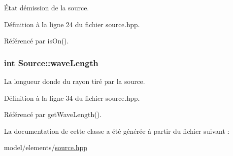 État d\textquotesingle{}émission de la source. 



Définition à la ligne 24 du fichier source.\+hpp.



Référencé par is\+On().

\hypertarget{classSource_a1909285fbaf2074d3aee9386a32ebb74}{}
\subsubsection[{wave\+Length}]{\setlength{\rightskip}{0pt plus 5cm}int Source\+::wave\+Length\hspace{0.3cm}{\ttfamily [private]}}\label{classSource_a1909285fbaf2074d3aee9386a32ebb74}


La longueur d\textquotesingle{}onde du rayon tiré par la source. 



Définition à la ligne 34 du fichier source.\+hpp.



Référencé par get\+Wave\+Length().



La documentation de cette classe a été générée à partir du fichier suivant \+:\begin{DoxyCompactItemize}
\item 
model/elements/\hyperlink{source_8hpp}{source.\+hpp}\end{DoxyCompactItemize}
